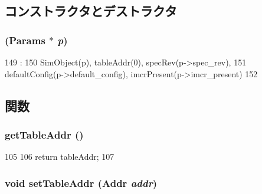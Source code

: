 \subsection{コンストラクタとデストラクタ}
\hypertarget{classX86ISA_1_1IntelMP_1_1FloatingPointer_ad1eac1c8c7bc3ba0624ff9018b113597}{
\subsubsection[{FloatingPointer}]{ ({\bf Params} $\ast$ {\em p})}}
\label{classX86ISA_1_1IntelMP_1_1FloatingPointer_ad1eac1c8c7bc3ba0624ff9018b113597}



\begin{DoxyCode}
149                                                         :
150     SimObject(p), tableAddr(0), specRev(p->spec_rev),
151     defaultConfig(p->default_config), imcrPresent(p->imcr_present)
152 {}

\end{DoxyCode}


\subsection{関数}
\hypertarget{classX86ISA_1_1IntelMP_1_1FloatingPointer_ad2b5276c95bbec6102bd1b9f1eb8ea26}{
\subsubsection[{getTableAddr}]{ getTableAddr ()}}
\label{classX86ISA_1_1IntelMP_1_1FloatingPointer_ad2b5276c95bbec6102bd1b9f1eb8ea26}



\begin{DoxyCode}
105     {
106         return tableAddr;
107     }
\end{DoxyCode}
\hypertarget{classX86ISA_1_1IntelMP_1_1FloatingPointer_aeaa306e0b92006f1478facf62f5d93d9}{
\subsubsection[{setTableAddr}]{\setlength{\rightskip}{0pt plus 5cm}void setTableAddr ({\bf Addr} {\em addr})}}
\label{classX86ISA_1_1IntelMP_1_1FloatingPointer_aeaa306e0b92006f1478facf62f5d93d9}



